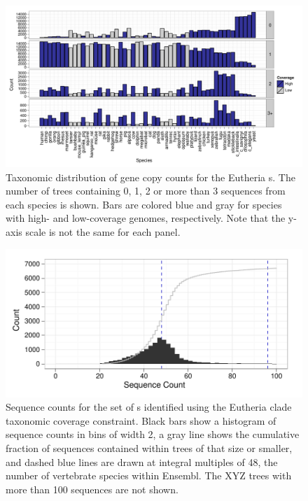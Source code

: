 \begin{landscape}
\begin{figure}
\centering
\includegraphics[scale=0.9]{Figs/ortholog_euth_dups.pdf}
\caption{Taxonomic distribution of gene copy counts for the Eutheria
  \subtr{}s. The number of trees containing 0, 1, 2 or more than 3
  sequences from each species is shown. Bars are colored blue and gray
  for species with high- and low-coverage genomes, respectively. Note
  that the y-axis scale is not the same for each panel.}
\label{ortholog_euth_dups}
\end{figure}
\end{landscape}

\begin{figure}
\centering
\includegraphics[scale=0.9]{Figs/ensembl_euth_hist.pdf}
\caption{Sequence counts for the set of \subtr{}s identified using the
  Eutheria clade taxonomic coverage constraint. Black bars show a
  histogram of sequence counts in bins of width 2, a gray line shows
  the cumulative fraction of sequences contained within trees of that
  size or smaller, and dashed blue lines are drawn at integral
  multiples of 48, the number of vertebrate species within
  Ensembl. The XYZ trees with more than 100 sequences are not shown.}
\label{ensembl_euth_hist}
\end{figure}

